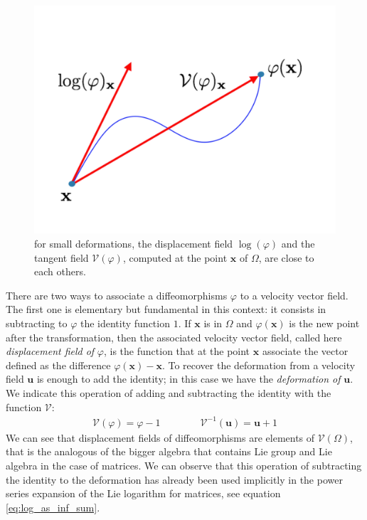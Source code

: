\begin{figure}[!ht]
	\centering
	\includegraphics[scale=0.25]{figures/exp_versus_v.pdf}
	\caption{for small deformations, the displacement field $\log(\varphi)$ and the tangent field $\mathcal{V}(\varphi)$, computed at the point $\mathbf{x}$ of $\Omega$, are close to each others.}
	\label{fig:exp_versus_v}
\end{figure}

There are two ways to associate a diffeomorphisms $\varphi$ to a velocity vector field. The first one is elementary but fundamental in this context: it consists in subtracting to $\varphi$ the identity function $1$. If $\mathbf{x}$ is in $\Omega$ and $\varphi(\mathbf{x})$ is the new point after the transformation, then the associated velocity vector field, called here \emph{displacement field of} $\varphi$, is the function that at the point $\mathbf{x}$ associate the vector defined as the difference $\varphi(\mathbf{x}) - \mathbf{x}$. To recover the deformation from a velocity field $\mathbf{u}$ is enough to add the identity; in this case we have the \emph{deformation of} $\mathbf{u}$. We indicate this operation of adding and subtracting the identity with the function $\mathcal{V}$:
\begin{align*}
\mathcal{V}(\varphi) = \varphi - 1 
\qquad \qquad
\mathcal{V}^{-1}(\mathbf{u}) = \mathbf{u} + 1 
\end{align*}
We can see that displacement fields of diffeomorphisms are elements of $\mathcal{V}(\Omega)$, that is the analogous of the bigger algebra that contains Lie group and Lie algebra in the case of matrices. We can observe that this operation of subtracting the identity to the deformation has already been used implicitly in the power series expansion of the Lie logarithm for matrices, see equation \ref{eq:log_as_inf_sum}.

